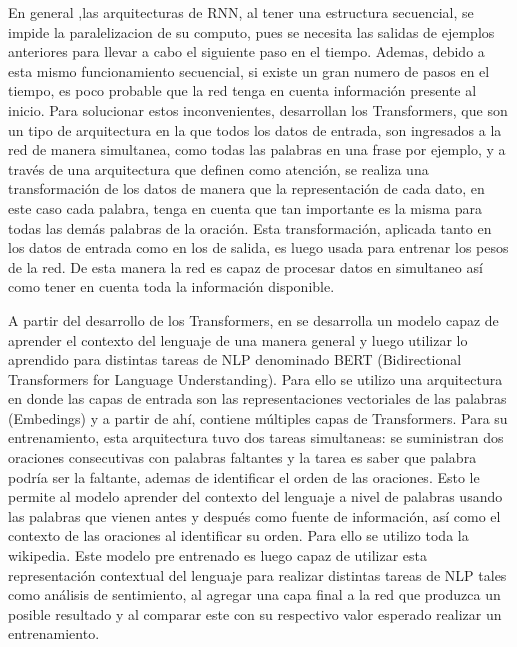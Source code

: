 En general ,las arquitecturas de RNN, al tener una estructura secuencial, se impide la paralelizacion de su computo, pues se necesita las salidas de ejemplos anteriores para llevar a cabo el siguiente paso en el tiempo. Ademas, debido a esta mismo funcionamiento secuencial, si existe un gran numero de pasos en el tiempo, es poco probable que la red tenga en cuenta información presente al inicio. Para solucionar estos inconvenientes, \cite{vaswani2017attention} desarrollan los Transformers, que son un tipo de arquitectura en la que todos los datos de entrada, son ingresados a la red de manera simultanea, como todas las palabras en una frase por ejemplo, y a través de una arquitectura que definen como atención, se realiza una transformación de los datos de manera que la representación de cada dato, en este caso cada palabra, tenga en cuenta que tan importante es la misma para todas las demás palabras de la oración. Esta transformación, aplicada tanto en los datos de entrada como en los de salida, es luego usada para entrenar los pesos de la red. De esta manera la red es capaz de procesar datos en simultaneo así como tener en cuenta toda la información disponible.
 

A partir del desarrollo de los Transformers, en  \cite{devlin2018bert} se desarrolla un modelo capaz de aprender el contexto del lenguaje de una manera general y luego utilizar lo aprendido para distintas tareas de NLP denominado BERT (Bidirectional Transformers for Language Understanding). Para ello se utilizo una arquitectura en donde las capas de entrada son las representaciones vectoriales de las palabras (Embedings) y a partir de ahí, contiene múltiples capas de Transformers. Para su entrenamiento, esta arquitectura tuvo dos tareas simultaneas: se suministran dos oraciones consecutivas con palabras faltantes y la tarea es saber que palabra podría ser la faltante, ademas de identificar el orden de las oraciones. Esto le permite al modelo aprender del contexto del lenguaje a nivel de palabras usando las palabras que vienen antes y después como fuente de información, así como el contexto de las oraciones al identificar su orden. Para ello se utilizo toda la wikipedia. Este modelo pre entrenado es luego capaz de utilizar esta representación contextual del lenguaje para realizar distintas tareas de NLP tales como análisis de sentimiento, al agregar una capa final a la red que produzca un posible resultado y al comparar este con su respectivo valor esperado realizar un entrenamiento.



